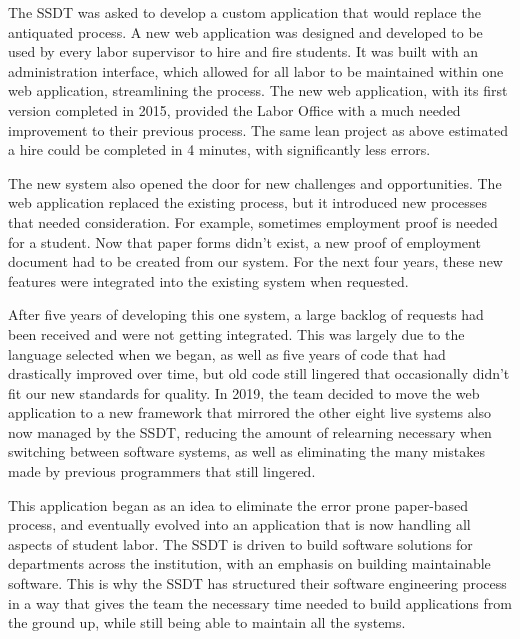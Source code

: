 The SSDT was asked to develop a custom application that would replace the antiquated process. A new web application was designed and developed to be used by every labor supervisor to hire and fire students. It was built with an administration interface, which allowed for all labor to be maintained within one web application, streamlining the process. The new web application, with its first version completed in 2015, provided the Labor Office with a much needed improvement to their previous process. The same lean project as above estimated a hire could be completed in 4 minutes, with significantly less errors.

The new system also opened the door for new challenges and opportunities. The web application replaced the existing process, but it introduced new processes that needed consideration. For example, sometimes employment proof is needed for a student. Now that paper forms didn't exist, a new proof of employment document had to be created from our system. For the next four years, these new features were integrated into the existing system when requested.

After five years of developing this one system, a large backlog of requests had been received and were not getting integrated. This was largely due to the language selected when we began, as well as five years of code that had drastically improved over time, but old code still lingered that occasionally didn't fit our new standards for quality. In 2019, the team decided to move the web application to a new framework that mirrored the other eight live systems also now managed by the SSDT, reducing the amount of relearning necessary when switching between software systems, as well as eliminating the many mistakes made by previous programmers that still lingered.

This application began as an idea to eliminate the error prone paper-based process, and eventually evolved into an application that is now handling all aspects of student labor. The SSDT is driven to build software solutions for departments across the institution, with an emphasis on building maintainable software. This is why the SSDT has structured their software engineering process in a way that gives the team the necessary time needed to build applications from the ground up, while still being able to maintain all the systems.
